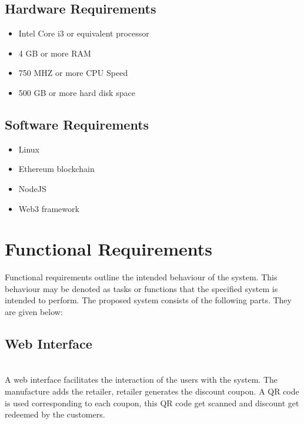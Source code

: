 \subsection{Hardware Requirements}
\begin{itemize}
    \item Intel Core i3 or equivalent processor
    \item 4 GB or more RAM
    \item 750 MHZ or more CPU Speed
    \item 500 GB  or more hard disk space
\end{itemize}

\subsection{Software Requirements}
\begin{itemize}
    \item Linux
    \item Ethereum blockchain 
    \item NodeJS
    \item Web3 framework
\end{itemize}

\section{Functional Requirements}
Functional requirements outline the intended behaviour of the system. This behaviour may be denoted as tasks or functions that the specified system is intended to perform. The proposed system consists of the following parts. They are given below:\\
\subsection{Web Interface} \\
A web interface facilitates the interaction of the users with the system. The
manufacture adds the retailer, retailer generates the discount coupon. A QR code
is used corresponding to each coupon, this QR code get scanned and discount get
redeemed by the customers.
